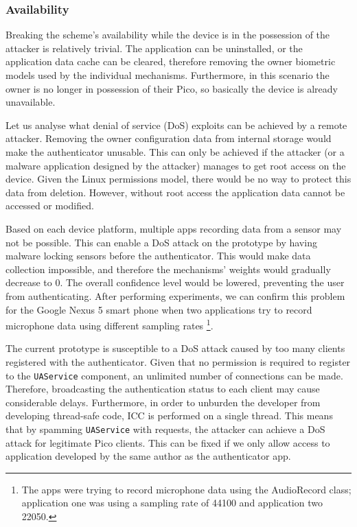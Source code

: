 \subsubsection*{Availability}
Breaking the scheme's availability while the device is in the possession of the attacker is relatively trivial. The application can be uninstalled, or the application data cache can be cleared, therefore removing the owner biometric models used by the individual mechanisms. Furthermore, in this scenario the owner is no longer in possession of their Pico, so basically the device is already unavailable.

Let us analyse what denial of service (DoS) exploits can be achieved by a remote attacker. Removing the owner configuration data from internal storage would make the authenticator unusable. This can only be achieved if the attacker (or a malware application designed by the attacker) manages to get root access on the device. Given the Linux permissions model, there would be no way to protect this data from deletion. However, without root access the application data cannot be accessed or modified.

Based on each device platform, multiple apps recording data from a sensor may not be possible. This can enable a DoS attack on the prototype by having malware locking sensors before the authenticator. This would make data collection impossible, and therefore the mechanisms' weights would gradually decrease to 0. The overall confidence level would be lowered, preventing the user from authenticating. After performing experiments, we can confirm this problem for the Google Nexus 5 smart phone when two applications try to record microphone data using different sampling rates \footnote{The apps were trying to record microphone data using the AudioRecord class; application one was using a sampling rate of 44100 and application two 22050.}.

The current prototype is susceptible to a DoS attack caused by too many clients registered with the authenticator. Given that no permission is required to register to the {\tt UAService} component, an unlimited number of connections can be made. Therefore, broadcasting the authentication status to each client may cause considerable delays. Furthermore, in order to unburden the developer from developing thread-safe code, ICC is performed on a single thread. This means that by spamming {\tt UAService} with requests, the attacker can achieve a DoS attack for legitimate Pico clients. This can be fixed if we only allow access to application developed by the same author as the authenticator app.

